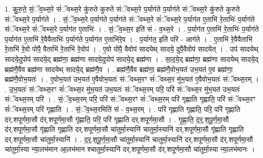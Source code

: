 \documentclass[17pt]{extarticle}
\begin{document}
1. कु॒रु॒ते॒ सं॒ॅव॒थ्स॒रे सं॑ॅवथ्स॒रे कु॑रुते कुरुते संॅवथ्स॒रे प॒र्याग॑ते प॒र्याग॑ते संॅवथ्स॒रे कु॑रुते कुरुते संॅवथ्स॒रे प॒र्याग॑ते । . सं॒ॅव॒थ्स॒रे प॒र्याग॑ते प॒र्याग॑ते संॅवथ्स॒रे सं॑ॅवथ्स॒रे प॒र्याग॑त ए॒ताभि॑ रे॒ताभिः॑ प॒र्याग॑ते संॅवथ्स॒रे सं॑ॅवथ्स॒रे प॒र्याग॑त ए॒ताभिः॑ । . सं॒ॅव॒थ्स॒र इति॑ सं - व॒थ्स॒रे । . प॒र्याग॑त ए॒ताभि॑ रे॒ताभिः॑ प॒र्याग॑ते प॒र्याग॑त ए॒ताभि॑ रे॒वैवैताभिः॑ प॒र्याग॑ते प॒र्याग॑त ए॒ताभि॑रे॒व । . प॒र्याग॑त॒ इति॑ परि - आग॑ते । . ए॒ताभि॑ रे॒वैवैताभि॑ रे॒ताभि॑ रे॒वो पोपै॒ वैताभि॑ रे॒ताभि॑ रे॒वोप॑ । . ए॒वो पोपै॒ वैवोप॑ सादयेथ् सादये॒ दुपै॒वैवोप॑ सादयेत् । . उप॑ सादयेथ् सादये॒दुपोप॑ सादये॒द् ब्रह्म॑णा॒ ब्रह्म॑णा सादये॒दुपोप॑ सादये॒द् ब्रह्म॑णा । . सा॒द॒ये॒द् ब्रह्म॑णा॒ ब्रह्म॑णा सादयेथ् सादये॒द् ब्रह्म॑णै॒वैव ब्रह्म॑णा सादयेथ् सादये॒द् ब्रह्म॑णै॒व । . ब्रह्म॑णै॒वैव ब्रह्म॑णा॒ ब्रह्म॑णै॒वोभ॒यत॑ उभ॒यत॑ ए॒व ब्रह्म॑णा॒ ब्रह्म॑णै॒वोभ॒यतः॑ । . ए॒वोभ॒यत॑ उभ॒यत॑ ए॒वैवोभ॒यतः॑ संॅवथ्स॒रꣳ सं॑ॅवथ्स॒र मु॑भ॒यत॑ ए॒वैवोभ॒यतः॑ संॅवथ्स॒रम् । . उ॒भ॒यतः॑ संॅवथ्स॒रꣳ सं॑ॅवथ्स॒र मु॑भ॒यत॑ उभ॒यतः॑ संॅवथ्स॒रम् परि॒ परि॑ संॅवथ्स॒र मु॑भ॒यत॑ उभ॒यतः॑ संॅवथ्स॒रम् परि॑ । . सं॒ॅव॒थ्स॒रम् परि॒ परि॑ संॅवथ्स॒रꣳ सं॑ॅवथ्स॒रम् परि॑ गृह्णाति गृह्णाति॒ परि॑ संॅवथ्स॒रꣳ सं॑ॅवथ्स॒रम् परि॑ गृह्णाति । . सं॒ॅव॒थ्स॒रमिति॑ सं - व॒थ्स॒रम् । . परि॑ गृह्णाति गृह्णाति॒ परि॒ परि॑ गृह्णाति दर्.शपूर्णमा॒सौ द॑र्.शपूर्णमा॒सौ गृ॑ह्णाति॒ परि॒ परि॑ गृह्णाति दर्.शपूर्णमा॒सौ । . गृ॒ह्णा॒ति॒ द॒र्॒.श॒पू॒र्ण॒मा॒सौ द॑र्.शपूर्णमा॒सौ गृ॑ह्णाति गृह्णाति दर्.शपूर्णमा॒सौ चा॑तुर्मा॒स्यानि॑ चातुर्मा॒स्यानि॑ दर्.शपूर्णमा॒सौ गृ॑ह्णाति गृह्णाति दर्.शपूर्णमा॒सौ चा॑तुर्मा॒स्यानि॑ । . द॒र्॒.श॒पू॒र्ण॒मा॒सौ चा॑तुर्मा॒स्यानि॑ चातुर्मा॒स्यानि॑ दर्.शपूर्णमा॒सौ द॑र्.शपूर्णमा॒सौ चा॑तुर्मा॒स्या न्या॒लभ॑मान आ॒लभ॑मान श्चातुर्मा॒स्यानि॑ दर्.शपूर्णमा॒सौ द॑र्.शपूर्णमा॒सौ चा॑तुर्मा॒स्या न्या॒लभ॑मानः । \newline
\end{document}

